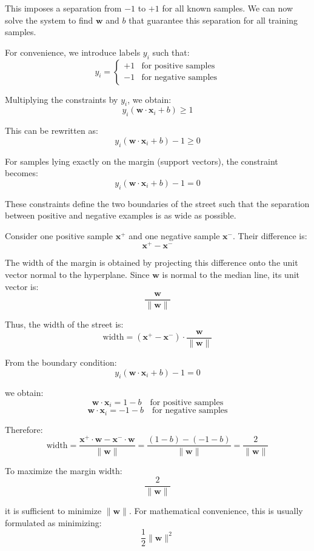 This imposes a separation from $-1$ to $+1$ for all known samples.
We can now solve the system to find $\mathbf{w}$ and $b$ that guarantee this separation for all training samples.


For convenience, we introduce labels $y_i$ such that:
\[
y_i =
\begin{cases}
+1 & \text{for positive samples} \\
-1 & \text{for negative samples}
\end{cases}
\]

Multiplying the constraints by $y_i$, we obtain:
\[
y_i \left( \mathbf{w} \cdot \mathbf{x}_i + b \right) \ge 1
\]

This can be rewritten as:
\[
y_i \left( \mathbf{w} \cdot \mathbf{x}_i + b \right) - 1 \ge 0
\]


For samples lying exactly on the margin (support vectors), the constraint becomes:
\[
y_i \left( \mathbf{w} \cdot \mathbf{x}_i + b \right) - 1 = 0
\]


These constraints define the two boundaries of the street such that the separation between positive and negative examples is as wide as possible.


Consider one positive sample $\mathbf{x}^+$ and one negative sample $\mathbf{x}^-$.
Their difference is:
\[
\mathbf{x}^+ - \mathbf{x}^-
\]

The width of the margin is obtained by projecting this difference onto the unit vector normal to the hyperplane.
Since $\mathbf{w}$ is normal to the median line, its unit vector is:
\[
\frac{\mathbf{w}}{\|\mathbf{w}\|}
\]

Thus, the width of the street is:
\[
\text{width} = (\mathbf{x}^+ - \mathbf{x}^-) \cdot \frac{\mathbf{w}}{\|\mathbf{w}\|}
\]


From the boundary condition:
\[
y_i \left( \mathbf{w} \cdot \mathbf{x}_i + b \right) - 1 = 0
\]

we obtain:
\[
\mathbf{w} \cdot \mathbf{x}_i = 1 - b \quad \text{for positive samples}
\]
\[
\mathbf{w} \cdot \mathbf{x}_i = -1 - b \quad \text{for negative samples}
\]

Therefore:
\[
\text{width} =
\frac{\mathbf{x}^+ \cdot \mathbf{w} - \mathbf{x}^- \cdot \mathbf{w}}{\|\mathbf{w}\|}
=
\frac{(1 - b) - (-1 - b)}{\|\mathbf{w}\|}
=
\frac{2}{\|\mathbf{w}\|}
\]


To maximize the margin width:
\[
\frac{2}{\|\mathbf{w}\|}
\]

it is sufficient to minimize $\|\mathbf{w}\|$.
For mathematical convenience, this is usually formulated as minimizing:
\[
\frac{1}{2} \|\mathbf{w}\|^2
\]

